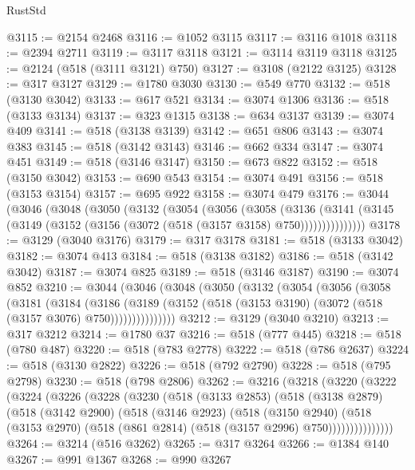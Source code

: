 \begin{lexlean}{RustStd}
\begin{coremodule}
{\begin{coremodule}
{{{{{{{{{{{{{{{{{{{{{{{{{{{{{{{{{{{{{{{{{{{{{{{{{{@3115 := @2154 @2468
@3116 := @1052 @3115
@3117 := @3116 @1018
@3118 := @2394 @2711
@3119 := @3117 @3118
@3121 := @3114 @3119 @3118
@3125 := @2124 (@518 (@3111 @3121) @750)
@3127 := @3108 (@2122 @3125)
@3128 := @317 @3127
@3129 := @1780 @3030
@3130 := @549 @770
@3132 := @518 (@3130 @3042)
@3133 := @617 @521
@3134 := @3074 @1306
@3136 := @518 (@3133 @3134)
@3137 := @323 @1315
@3138 := @634 @3137
@3139 := @3074 @409
@3141 := @518 (@3138 @3139)
@3142 := @651 @806
@3143 := @3074 @383
@3145 := @518 (@3142 @3143)
@3146 := @662 @334
@3147 := @3074 @451
@3149 := @518 (@3146 @3147)
@3150 := @673 @822
@3152 := @518 (@3150 @3042)
@3153 := @690 @543
@3154 := @3074 @491
@3156 := @518 (@3153 @3154)
@3157 := @695 @922
@3158 := @3074 @479
@3176 := @3044
    (@3046
      (@3048
        (@3050
          (@3132
            (@3054
              (@3056
                (@3058
                  (@3136
                    (@3141
                      (@3145 (@3149 (@3152 (@3156 (@3072 (@518 (@3157 @3158) @750)))))))))))))))
@3178 := @3129 (@3040 @3176)
@3179 := @317 @3178
@3181 := @518 (@3133 @3042)
@3182 := @3074 @413
@3184 := @518 (@3138 @3182)
@3186 := @518 (@3142 @3042)
@3187 := @3074 @825
@3189 := @518 (@3146 @3187)
@3190 := @3074 @852
@3210 := @3044
    (@3046
      (@3048
        (@3050
          (@3132
            (@3054
              (@3056
                (@3058
                  (@3181
                    (@3184
                      (@3186
                        (@3189
                          (@3152 (@518 (@3153 @3190) (@3072 (@518 (@3157 @3076) @750)))))))))))))))
@3212 := @3129 (@3040 @3210)
@3213 := @317 @3212
@3214 := @1780 @37
@3216 := @518 (@777 @445)
@3218 := @518 (@780 @487)
@3220 := @518 (@783 @2778)
@3222 := @518 (@786 @2637)
@3224 := @518 (@3130 @2822)
@3226 := @518 (@792 @2790)
@3228 := @518 (@795 @2798)
@3230 := @518 (@798 @2806)
@3262 := @3216
    (@3218
      (@3220
        (@3222
          (@3224
            (@3226
              (@3228
                (@3230
                  (@518
                    (@3133 @2853)
                    (@518
                      (@3138 @2879)
                      (@518
                        (@3142 @2900)
                        (@518
                          (@3146 @2923)
                          (@518
                            (@3150 @2940)
                            (@518
                              (@3153 @2970)
                              (@518 (@861 @2814) (@518 (@3157 @2996) @750)))))))))))))))
@3264 := @3214 (@516 @3262)
@3265 := @317 @3264
@3266 := @1384 @140
@3267 := @991 @1367
@3268 := @990 @3267
}}}}}}}}}}}}}}}}}}}}}}}}}}}}}}}}}}}}}}}}}}}}}}}}}}
\end{coremodule}}
\end{coremodule}
\end{lexlean}
